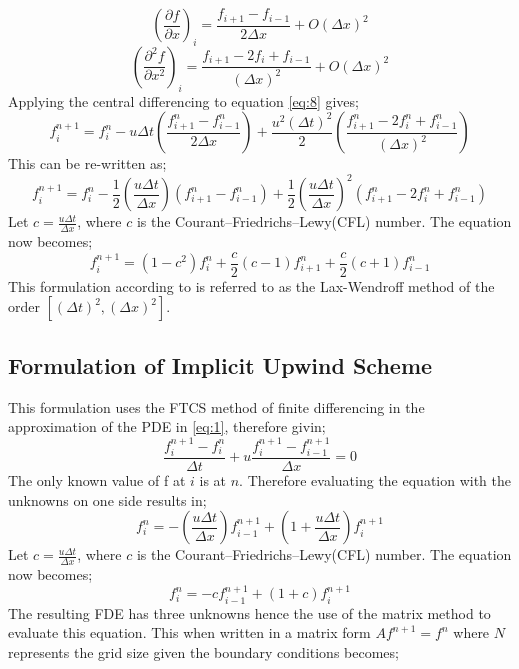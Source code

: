 \begin{equation*}
\left(\frac{\partial f}{\partial x}\right)_{i} = \frac{f_{i+1} - f_{i-1}}{2\Delta x} + O(\Delta x)^2 
\end{equation*}
 \begin{equation*}
 \left(\frac{\partial^2 f}{\partial x^2}\right)_{i} = \frac{f_{i+1} - 2f_{i} + f_{i-1}}{(\Delta x)^2} + O(\Delta x)^2 
 \end{equation*} 
Applying the central differencing to equation \eqref{eq:8} gives;
 \begin{equation*}
 f^{n+1}_{i} = f^{n}_{i} - u\Delta t\left(\frac{f^{n}_{i+1} - f^{n}_{i-1}}{2\Delta x}\right) + \frac{u^2(\Delta t)^2}{2}\left(\frac{f^{n}_{i+1} - 2f^{n}_{i} + f^{n}_{i-1}}{(\Delta x)^2}\right)
 \end{equation*}
 This can be re-written as;
 \begin{equation*}
 f^{n+1}_{i} = f^{n}_{i} -\frac{1}{2}\left(\frac{u\Delta t}{\Delta x}\right)\left(f^{n}_{i+1} - f^{n}_{i-1}\right) + \frac{1}{2}\left(\frac{u\Delta t}{\Delta x}\right)^2\left(f^{n}_{i+1} - 2f^{n}_{i} + f^{n}_{i-1}\right)
 \end{equation*}
 Let $c = \frac{u\Delta t}{\Delta x} $, where $c$ is the Courant–Friedrichs–Lewy(CFL) number. The equation now becomes;
 \begin{equation}
 \boxed{f^{n+1}_{i} = (1-c^2)f^{n}_{i} + \frac{c}{2}(c-1)f^{n}_{i+1} + \frac{c}{2}(c+1)f^{n}_{i-1}} \label{eq:9}
 \end{equation}
This formulation according to \cite{Hoffmann} is referred to as the Lax-Wendroff method of the order $ \left[(\Delta t)^2, (\Delta x)^2 \right] $.  

\subsection{Formulation of Implicit Upwind Scheme}
This formulation uses the FTCS method of finite differencing in the approximation of the PDE in \eqref{eq:1}, therefore givin;
\begin{equation}
\frac{f^{n+1}_{i} - f^{n}_{i}}{\Delta t} + u \frac{f^{n+1}_{i} - f^{n+1}_{i-1}}{\Delta x} = 0 \label{eq:10}
\end{equation}
The only known value of f at $i$ is at $n$. Therefore evaluating the equation with the unknowns on one side results in;
\begin{equation}
f^{n}_{i} = -\left(\frac{u\Delta t}{\Delta x}\right)f^{n+1}_{i-1} +\left(1 + \frac{u\Delta t}{\Delta x}\right) f^{n+1}_{i} \label{eq:11}
\end{equation}
Let $c = \frac{u\Delta t}{\Delta x} $, where $c$ is the Courant–Friedrichs–Lewy(CFL) number. The equation now becomes;
\begin{equation}
\boxed{f^{n}_{i} = -cf^{n+1}_{i-1} +\left(1 + c\right) f^{n+1}_{i} } \label{eq:12}
\end{equation} 
The resulting FDE has three unknowns hence the use of the matrix method to evaluate this equation. This when written in a matrix form $Af^{n+1} = f^n$ where $N$ represents the grid size given the boundary conditions becomes;


